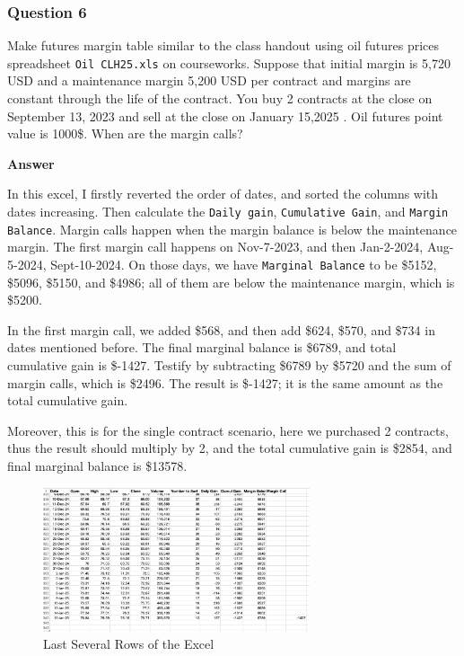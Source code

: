 \documentclass[margin=1in]{article}
\begin{document}
		  \subsubsection*{Question 6}
		  Make futures margin table similar to the class handout using oil futures prices spreadsheet \texttt{Oil CLH25.xls} on courseworks. Suppose that initial margin is 5,720 USD and a maintenance margin 5,200 USD per contract and margins are constant through the life of the contract. You buy 2 contracts at the close on September 13, 2023 and sell at the close on January 15,2025 . Oil futures point value is 1000\$. When are the margin calls?
		  
		  \textbf{Answer}
		  
		  In this excel, I firstly reverted the order of dates, and sorted the columns with dates increasing. Then calculate the \texttt{Daily gain}, \texttt{Cumulative Gain}, and \texttt{Margin Balance}. Margin calls happen when the margin balance is below the maintenance margin. The first margin call happens on Nov-7-2023, and then Jan-2-2024, Aug-5-2024, Sept-10-2024. On those days, we have \texttt{Marginal Balance} to be \$5152, \$5096, \$5150, and \$4986; all of them are below the maintenance margin, which is \$5200. 
		  
		  In the first margin call, we added \$568, and then add \$624, \$570, and \$734 in dates mentioned before. The final marginal balance is \$6789, and total cumulative gain is \$-1427. Testify by subtracting \$6789 by \$5720 and the sum of margin calls, which is \$2496. The result is \$-1427; it is the same amount as the total cumulative gain. 
		  
		  Moreover, this is for the single contract scenario, here we purchased 2 contracts, thus the result should multiply by 2, and the total cumulative gain is \$2854, and final marginal balance is \$13578.
		  
		  \begin{figure}[h]
		  	\caption{Last Several Rows of the Excel}
		  	\centering
		  	\includegraphics[width=0.7\textwidth]{HW1_Q6}
		  \end{figure}
		  
\end{document}
